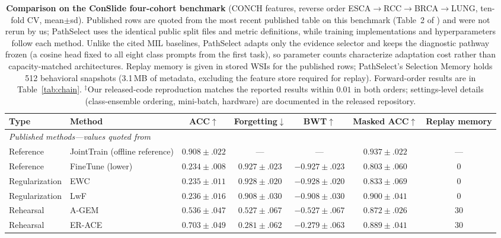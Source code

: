 \documentclass{article}
\begin{document}
\begin{table}[t]
\centering\footnotesize
\caption{\textbf{Comparison on the ConSlide four-cohort benchmark} \cite{huang2023conslide} (CONCH features, reverse order ESCA$\rightarrow$RCC$\rightarrow$BRCA$\rightarrow$LUNG, ten-fold CV, mean$\pm$sd). Published rows are quoted from the most recent published table on this benchmark (Table~2 of \cite{gou2025qpmil}) and were not rerun by us; PathSelect uses the identical public split files and metric definitions, while training implementations and hyperparameters follow each method. Unlike the cited MIL baselines, PathSelect adapts only the evidence selector and keeps the diagnostic pathway frozen (a cosine head fixed to all eight class prompts from the first task), so parameter counts characterize adaptation cost rather than capacity-matched architectures. Replay memory is given in stored WSIs for the published rows; PathSelect's Selection Memory holds 512 behavioral snapshots (3.1\,MB of metadata, excluding the feature store required for replay). Forward-order results are in Table~\ref{tab:chain}. $^\ddagger$Our released-code reproduction matches the reported results within $0.01$ in both orders; settings-level details (class-ensemble ordering, mini-batch, hardware) are documented in the released repository.}
\label{tab:sota}
\begin{tabular}{llccccc}
\toprule
Type & Method & ACC$\uparrow$ & Forgetting$\downarrow$ & BWT$\uparrow$ & Masked ACC$\uparrow$ & Replay memory \\
\midrule
\multicolumn{7}{l}{\emph{Published methods---values quoted from \cite{gou2025qpmil}}} \\
Reference & JointTrain (offline reference) & $0.908{\pm}.022$ & --- & --- & $0.937{\pm}.022$ & --- \\
Reference & FineTune (lower) & $0.234{\pm}.008$ & $0.927{\pm}.023$ & $-0.927{\pm}.023$ & $0.803{\pm}.060$ & 0 \\
Regularization & EWC \cite{kirkpatrick2017ewc} & $0.235{\pm}.011$ & $0.928{\pm}.020$ & $-0.928{\pm}.020$ & $0.833{\pm}.069$ & 0 \\
Regularization & LwF \cite{li2017lwf} & $0.236{\pm}.016$ & $0.908{\pm}.030$ & $-0.908{\pm}.030$ & $0.900{\pm}.041$ & 0 \\
Rehearsal & A-GEM \cite{chaudhry2019agem} & $0.536{\pm}.047$ & $0.527{\pm}.067$ & $-0.527{\pm}.067$ & $0.872{\pm}.026$ & 30 \\
Rehearsal & ER-ACE \cite{caccia2022erace} & $0.703{\pm}.049$ & $0.281{\pm}.062$ & $-0.279{\pm}.063$ & $0.889{\pm}.041$ & 30 \\

\end{tabular}
\end{table}
\end{document}
